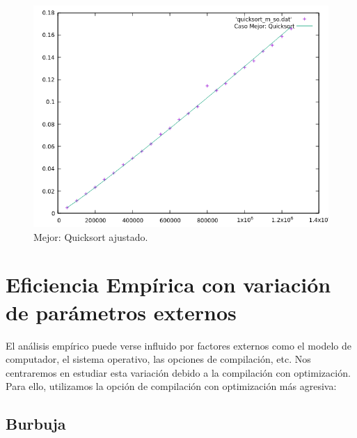 \documentclass[a4paper,12pt,twoside]{article} %
\begin{document}
\begin{itemize}
\begin{figure}[h]
\begin{center}
  	\includegraphics[scale=0.8]{quicksort_m_so_a.png}
  	\caption{Mejor: Quicksort ajustado.}
  	
  \end{center}
\end{figure}
	
	
	\end{itemize}
	
\newpage
	\section{Eficiencia Empírica con variación de parámetros externos}
	
	El análisis empírico puede verse influido por factores externos como el modelo de computador, el sistema operativo, las opciones de compilación, etc. Nos centraremos en estudiar esta variación debido a la compilación con optimización. Para ello, utilizamos la opción de compilación con optimización más agresiva:\\
	
\newpage


	\subsection{Burbuja}
	
\end{document}
